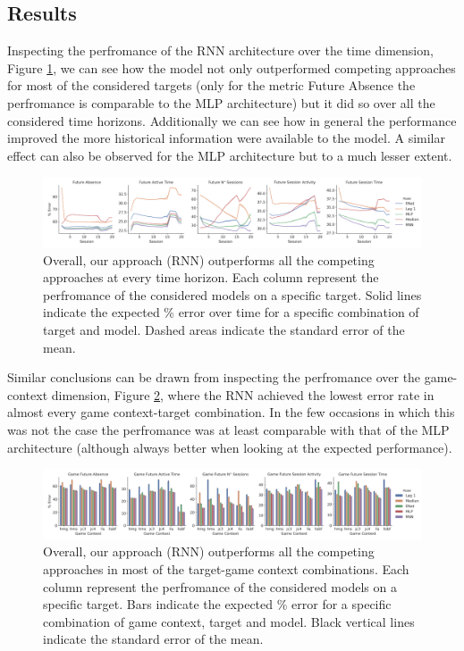 \subsection{Results}
\label{results_2}
Inspecting the perfromance of the RNN architecture over the time dimension, Figure \ref{model_comp_coll_game_32}, we can see how the model not only outperformed competing approaches for most of the considered targets (only for the metric Future Absence the perfromance is comparable to the MLP architecture) but it did so over all the considered time horizons. Additionally we can see how in general the performance improved the more historical information were available to the model. A similar effect can also be observed for the MLP architecture but to a much lesser extent.
\begin{figure}[h]
\centering
\includegraphics[width=\textwidth]{images/chapter_3/models_comparison_collapsed_game_32.png}
\caption[\textbf{Model comparison collapsing over game context}]{ Overall, our approach (RNN) outperforms all the competing approaches at every time horizon. Each column represent the perfromance of the considered models on a specific target. Solid lines indicate the expected \% error over time for a specific combination of target and model. Dashed areas indicate the standard error of the mean.}
\label{model_comp_coll_game_32}
\end{figure}
Similar conclusions can be drawn from inspecting the perfromance over the game-context dimension, Figure \ref{model_comp_coll_time_32}, where the RNN achieved the lowest error rate in almost every game context-target combination. In the few occasions in which this was not the case the perfromance was at least comparable with that of the MLP architecture (although always better when looking at the expected performance).
\begin{figure}[h]
\centering
\includegraphics[width=\textwidth]{images/chapter_3/models_comparison_collapsed_time_32.png}
\caption[\textbf{Model comparison collapsing over time}]{ Overall, our approach (RNN) outperforms all the competing approaches in most of the target-game context combinations. Each column represent the perfromance of the considered models on a specific target. Bars indicate the expected \% error for a specific combination of game context, target and model. Black vertical lines indicate the standard error of the mean.}
\label{model_comp_coll_time_32} 
\end{figure}
